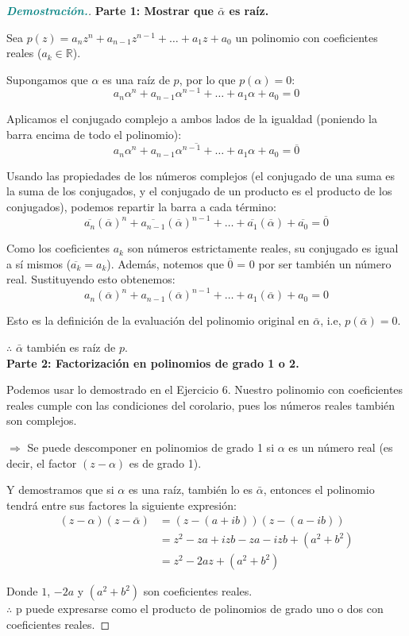 \documentclass[12pt, letterpaper]{article}
\begin{document}
\begin{proof}[\textbf{\textcolor{teal}{Demostración.}}]
    \textbf{Parte 1: Mostrar que $\bar{\alpha}$ es raíz.}
    
    Sea $p(z) = a_n z^n + a_{n-1} z^{n-1} + \dots + a_1 z + a_0$ un polinomio con coeficientes reales ($a_k \in \mathbb{R}$). 
    
    Supongamos que $\alpha$ es una raíz de $p$, por lo que $p(\alpha) = 0$:
    $$ a_n \alpha^n + a_{n-1} \alpha^{n-1} + \dots + a_1 \alpha + a_0 = 0 $$
    
    Aplicamos el conjugado complejo a ambos lados de la igualdad (poniendo la barra encima de todo el polinomio):
    $$ \overline{a_n \alpha^n + a_{n-1} \alpha^{n-1} + \dots + a_1 \alpha + a_0} = \overline{0} $$
    
    Usando las propiedades de los números complejos (el conjugado de una suma es la suma de los conjugados, y el conjugado de un producto es el producto de los conjugados), podemos repartir la barra a cada término:
    $$ \overline{a_n}(\overline{\alpha})^n + \overline{a_{n-1}}(\overline{\alpha})^{n-1} + \dots + \overline{a_1}(\overline{\alpha}) + \overline{a_0} = \overline{0} $$
    
    Como los coeficientes $a_k$ son números estrictamente reales, su conjugado es igual a sí mismos ($\overline{a_k} = a_k$). Además, notemos que $\overline{0}$ = 0 por ser también un número real. Sustituyendo esto obtenemos:
    $$ a_n(\overline{\alpha})^n + a_{n-1}(\overline{\alpha})^{n-1} + \dots + a_1(\overline{\alpha}) + a_0 = 0 $$
    
    Esto es la definición de la evaluación del polinomio original en $\bar{\alpha}$, i.e, $p(\bar{\alpha}) = 0$. 
    
    $\therefore$ $\bar{\alpha}$ también es raíz de $p$.\\
    
    \textbf{Parte 2: Factorización en polinomios de grado 1 o 2.}
    
    Podemos usar lo demostrado en el Ejercicio 6. Nuestro polinomio con coeficientes reales cumple con las condiciones del corolario, pues los números reales también son complejos.
    
    $\Rightarrow$ Se puede descomponer en polinomios de grado 1 si $\alpha$ es un número real (es decir, el factor $(z-\alpha)$ es de grado 1).
    
    Y demostramos que si $\alpha$ es una raíz, también lo es $\bar{\alpha}$, entonces el polinomio tendrá entre sus factores la siguiente expresión:
    \begin{align*}
        (z - \alpha)(z - \bar{\alpha}) &= (z - (a+ib))(z - (a-ib)) \\
        &= z^2 - za + izb - za - izb + (a^2+b^2) \\
        &= z^2 - 2az + (a^2+b^2)
    \end{align*}
    
    Donde $1$, $-2a$ y $(a^2+b^2)$ son coeficientes reales.\\

    $\therefore$ p puede expresarse como el producto de polinomios de grado uno o dos con coeficientes reales.
\end{proof}
\end{document}
